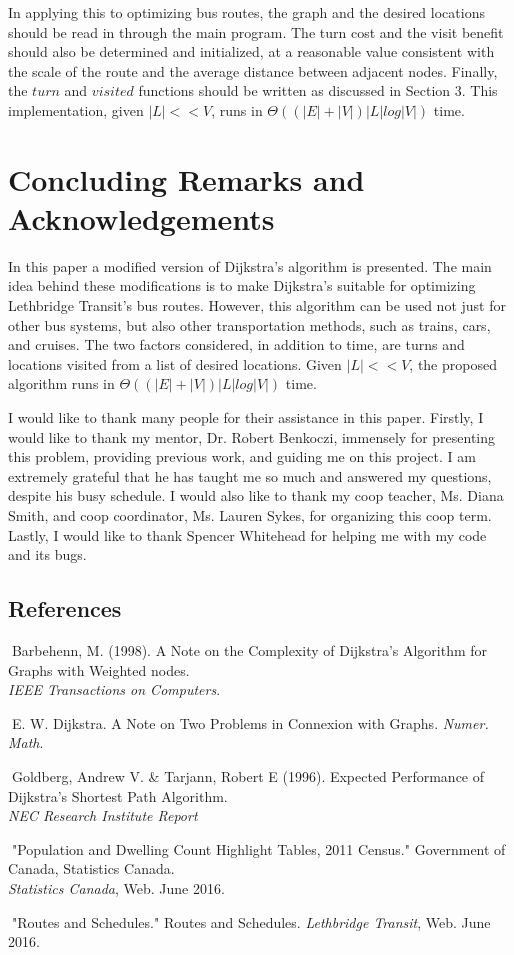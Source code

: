 \documentclass[letter,10pt]{article}
\begin{document}
In applying this to optimizing bus routes, the graph and the desired locations should be read in through the main program. The turn cost and the visit benefit should also be determined and initialized, at a reasonable value consistent with the scale of the route and the average distance between adjacent nodes. Finally, the $turn$ and $visited$ functions should be written as discussed in Section 3. This implementation, given $|L|<<V$, runs in $\Theta ((|E|+|V|)|L|log|V|)$ time.

\newpage
\section{Concluding Remarks and Acknowledgements} 
In this paper a modified version of Dijkstra's algorithm is presented. The main idea behind these modifications is to make Dijkstra's suitable for optimizing Lethbridge Transit's bus routes. However, this algorithm can be used not just for other bus systems, but also other transportation methods, such as trains, cars, and cruises. The two factors considered, in addition to time, are turns and locations visited from a list of desired locations. Given $|L|<<V$, the proposed algorithm runs in $\Theta ((|E|+|V|)|L|log|V|)$ time.

I would like to thank many people for their assistance in this paper. Firstly, I would like to thank my mentor, Dr. Robert Benkoczi, immensely for presenting this problem, providing previous work, and guiding me on this project. I am extremely grateful that he has taught me so much and answered my questions, despite his busy schedule. I would also like to thank my coop teacher, Ms. Diana Smith, and coop coordinator, Ms. Lauren Sykes, for organizing this coop term. Lastly, I would like to thank Spencer Whitehead for helping me with my code and its bugs.

\subsection*{References}
\noindent
[1] \textcolor{white}{.}Barbehenn, M. (1998). A Note on the Complexity of Dijkstra’s Algorithm for Graphs with Weighted nodes.\\ \indent \textit{IEEE Transactions on Computers}. 

\noindent
[2] \textcolor{white}{.}E. W. Dijkstra. A Note on Two Problems in Connexion with Graphs. \textit{Numer. Math}.

\noindent
[3] \textcolor{white}{.}Goldberg, Andrew V. \& Tarjann, Robert E (1996). Expected Performance of Dijkstra's Shortest Path Algorithm.\\ \indent \textit{NEC Research Institute Report}

\noindent
[4] \textcolor{white}{.}"Population and Dwelling Count Highlight Tables, 2011 Census." Government of Canada, Statistics Canada.\\ \indent \textit{Statistics Canada}, Web. June 2016.

\noindent
[5] \textcolor{white}{.}"Routes and Schedules." Routes and Schedules. \textit{Lethbridge Transit}, Web. June 2016.
\end{document}
